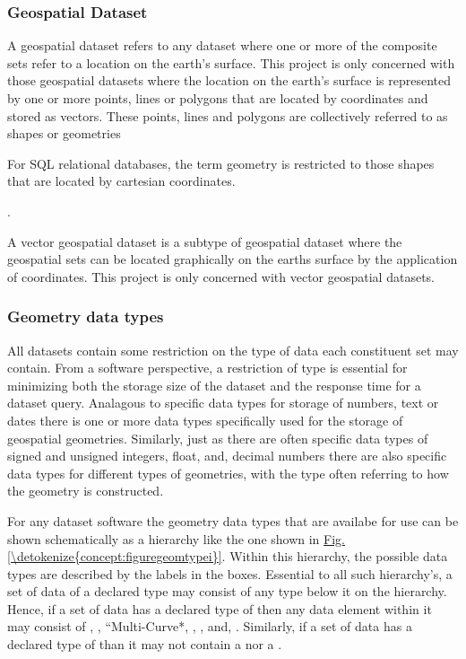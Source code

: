 \documentclass[letterpaper,10pt,english]{sphinxmanual}
\begin{document}
\subsubsection{Geospatial Dataset}
\label{\detokenize{concept:geospatial-dataset}}
A geospatial dataset refers to any dataset where one or more of the composite sets refer to a location on the earth’s surface.  This project is only concerned with those geospatial datasets where the location on the earth’s surface is represented by one or more points, lines or polygons that are located by coordinates and stored as vectors.  These points, lines and polygons are collectively referred to as shapes or geometries %
\begin{footnote}[5]\sphinxAtStartFootnote
For SQL relational databases, the term geometry is restricted to those shapes that are located by cartesian coordinates.
%
\end{footnote}.

A vector geospatial dataset is a subtype of geospatial dataset where the geospatial sets can be located graphically on the earths surface by the application of coordinates.  This project is only concerned with vector geospatial datasets.


\subsubsection{Geometry data types}
\label{\detokenize{concept:geometry-data-types}}
All datasets contain some restriction on the type of data each constituent set may contain.  From a software perspective, a restriction of type is essential for minimizing both the storage size of the dataset and the response time for a dataset query.  Analagous to specific data types for storage of numbers, text or dates there is one or more data types specifically used for the storage of geospatial geometries.  Similarly, just as there are often specific data types of signed and unsigned integers, float, and, decimal numbers there are also specific data types for different types of geometries, with the type often referring to how the geometry is constructed.

For any dataset software the geometry data types that are availabe for use can be shown schematically as a hierarchy like the one shown in \hyperref[\detokenize{concept:figuregeomtypei}]{Fig.\@ \ref{\detokenize{concept:figuregeomtypei}}}.  Within this hierarchy, the possible data types are described by the labels in the boxes.  Essential to all such hierarchy’s, a set of data of a declared type may consist of any type below it on the hierarchy.  Hence, if a set of data has a declared type of  then any data element within it may consist of , , “Multi-Curve*, , , and, .  Similarly, if a set of data has a declared type of  than it may not contain a  nor a .
\end{document}
